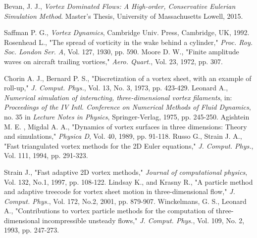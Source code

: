 \documentclass[]{aiaa-tc}%
\begin{document}

\newpage
\begin{thebibliography}{9}%
Bevan, J. J., \textit{Vortex Dominated Flows: A High-order, Conservative Eulerian Simulation Method}. Master's Thesis, University of Massachusetts Lowell, 2015.

Saffman P. G., \textit{Vortex Dynamics}, Cambridge Univ. Press, Cambridge, UK, 1992.
Rosenhead L., "The spread of vorticity in the wake behind a cylinder," \textit{Proc. Roy. Soc. London Ser. A}, Vol. 127, 1930, pp. 590.
Moore D. W., "Finite amplitude waves on aircraft trailing vortices," \textit{Aero. Quart.}, Vol. 23, 1972, pp. 307.

Chorin A. J., Bernard P. S., "Discretization of a vortex sheet, with an example of roll-up," \textit{J. Comput. Phys.}, Vol. 13, No. 3, 1973, pp. 423-429.
Leonard A., \textit{Numerical simulation of interacting, three-dimensional vortex filaments}, in: \textit{Proceedings of the IV Intl. Conference on Numerical Methods of Fluid Dynamics}, no. 35 in \textit{Lecture Notes in Physics}, Springer-Verlag, 1975, pp. 245-250.
Agishtein M. E. , Migdal A. A., "Dynamics of vortex surfaces in three dimensions: Theory and simulations," \textit{Physica D}, Vol. 40, 1989, pp. 91-118.
Russo G., Strain J. A., "Fast triangulated vortex methods for the 2D Euler equations," \textit{J. Comput. Phys.}, Vol. 111, 1994, pp. 291-323.

Strain J., "Fast adaptive 2D vortex methods," \textit{Journal of computational physics}, Vol. 132, No.1, 1997, pp. 108-122.
Lindsay K., and Krasny R., "A particle method and adaptive treecode for vortex sheet motion in three-dimensional flow," \textit{J. Comput. Phys.}, Vol. 172, No.2, 2001, pp. 879-907.
Winckelmans, G. S., Leonard A., "Contributions to vortex particle methods for the computation of three-dimensional incompressible unsteady flows," \textit{J. Comput. Phys.}, Vol. 109, No. 2, 1993, pp. 247-273.


\end{thebibliography}
\end{document}
